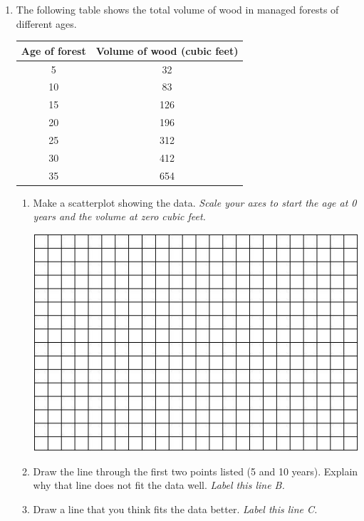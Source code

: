 \documentclass[12pt]{article}
\begin{document}
\begin{enumerate}
\newpage

\item The following table shows the total volume of wood in managed forests of different ages.

\begin{center}
\begin{tabular} { | c | c |} \hline
Age of forest & Volume of wood (cubic feet)  \\ \hline \hline
5 & 32   \\ \hline
10 & 83   \\ \hline
15 & 126  \\ \hline
20 & 196  \\  \hline
25 & 312  \\ \hline
30 & 412  \\ \hline
35 & 654 \\ \hline
\end{tabular}
\end{center}

\begin{enumerate}
\item Make a scatterplot showing the data.  \emph{Scale your axes to start the age at 0 years and the volume at zero cubic feet.}
\vfill
\begin{center}
 {\includegraphics [width = 6in] {../GraphPaper}}
\end{center}
\vfill

\item  Draw the line through the first two points listed (5 and 10 years).  Explain why that line does not fit the data well.  \emph{Label this line B.}
\vfill
\vfill
\vfill
\item  Draw a line that you think fits the data better.  \emph{Label this line C.}
\end{enumerate}


\end{enumerate}
\end{document}
